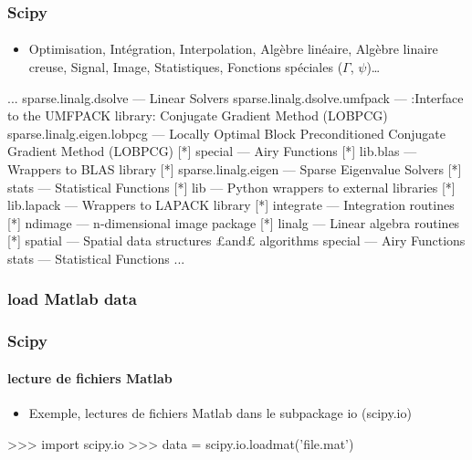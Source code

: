 \begin{frame}[fragile]
\frametitle{Scipy}
\framesubtitle{}
\begin{itemize}
 \item Optimisation, Intégration, Interpolation, Algèbre linéaire, Algèbre linaire creuse, Signal, Image, Statistiques, Fonctions spéciales ($\Gamma$, $\psi$)\dots
\end{itemize}
\begin{pythonConsole}
    ...
     sparse.linalg.dsolve         --- Linear Solvers
     sparse.linalg.dsolve.umfpack --- :Interface to the UMFPACK library:
                                      Conjugate Gradient Method (LOBPCG)
     sparse.linalg.eigen.lobpcg   --- Locally Optimal Block Preconditioned
                                      Conjugate Gradient Method (LOBPCG) [*]
     special                      --- Airy Functions [*]
     lib.blas                     --- Wrappers to BLAS library [*]
     sparse.linalg.eigen          --- Sparse Eigenvalue Solvers [*]
     stats                        --- Statistical Functions [*]
     lib                          --- Python wrappers to external libraries
                                      [*]
     lib.lapack                   --- Wrappers to LAPACK library [*]
     integrate                    --- Integration routines [*]
     ndimage                      --- n-dimensional image package [*]
     linalg                       --- Linear algebra routines [*]
     spatial                      --- Spatial data structures £and£ algorithms
     special                      --- Airy Functions
     stats                        --- Statistical Functions
    ...
\end{pythonConsole}
\end{frame}
\subsubsection{load Matlab data}
\begin{frame}[fragile]
\frametitle{Scipy}
\framesubtitle{lecture de fichiers Matlab}
\begin{itemize}
 \item Exemple, lectures de fichiers Matlab dans le subpackage io (scipy.io)
\end{itemize}

\begin{pythonConsole}
>>> import scipy.io
>>> data = scipy.io.loadmat('file.mat')
\end{pythonConsole}
\end{frame}
